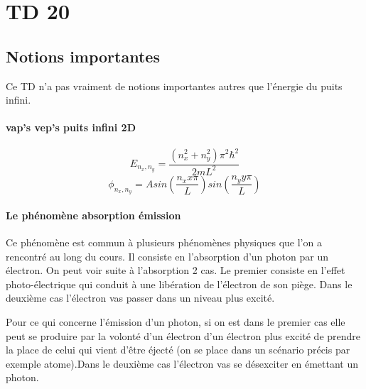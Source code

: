 \section{TD 20}



\subsection{Notions importantes}


Ce TD n'a pas vraiment de notions importantes autres que l'énergie du puits infini.

\paragraph{vap's vep's puits infini 2D }

\[
	E_{n_x,n_y}=\frac{(n_x^2+n_y^2 )\pi^2\hbar^2}{2mL^2}
\]
\[
	\phi_{n_x,n_y}=Asin(\frac{n_xx\pi}{L})sin(\frac{n_yy\pi}{L})
\]

\paragraph{Le phénomène absorption émission}

Ce phénomène est commun à plusieurs phénomènes physiques que l'on a rencontré au long du cours. Il consiste en l'absorption d'un photon par un électron. On peut voir suite à l'absorption 2 cas. Le premier consiste en l'effet photo-électrique qui conduit à une libération de l'électron de son piège. Dans le deuxième cas l'électron vas passer dans un niveau plus excité. 

Pour ce qui concerne l'émission d'un photon, si on est dans le premier cas elle peut se produire par la volonté d'un électron d'un électron plus excité de prendre la place de celui qui vient d'être éjecté (on se place dans un scénario précis par exemple atome).Dans le deuxième cas l'électron vas se désexciter en émettant un photon.
